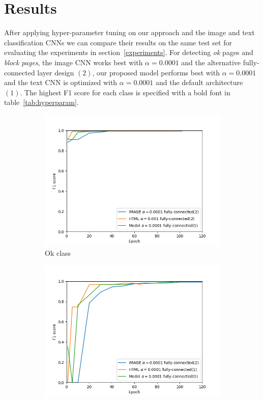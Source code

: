 \documentclass{article} %
\begin{document}
\section{Results}
After applying hyper-parameter tuning on our approach and the image and text classification CNNs we can compare their results on the same test set for evaluating the experiments in section~\ref{experiments}. For detecting \textit{ok} pages and \textit{block pages}, the image CNN works best with $\alpha=0.0001$ and the alternative fully-connected layer design $(2)$, our proposed model performs best with $\alpha=0.0001$ and the text CNN is optimized with $\alpha=0.0001$ and the default architecture $(1)$. The highest F1 score for each class is specified with a bold font in table~\ref{tab:hyperparam}.
\begin{figure}
        \centering
        \begin{subfigure}[b]{0.48\textwidth}
            \centering
            \includegraphics[width=\textwidth]{okF1.png}
            \caption[]%
            {{\small Ok class}}    
            \label{fig:okF1}
        \end{subfigure}
        \hfill
        \begin{subfigure}[b]{0.48\textwidth}  
            \centering 
            \includegraphics[width=\textwidth]{blockF1.png}

\end{subfigure}
\end{figure}
\end{document}
